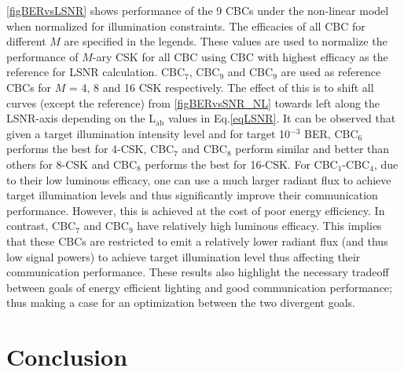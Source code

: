 \documentclass[10pt,letterpaper]{article}
\begin{document}
\figurename{ }\ref{figBERvsLSNR} shows performance of the 9 CBCs under the non-linear model when normalized for illumination constraints. The efficacies of all CBC for different $M$ are specified in the legends. These values are used to normalize the performance of $M$-ary CSK for all CBC using CBC with highest efficacy as the reference for LSNR calculation. CBC$_{7}$, CBC$_{9}$ and CBC$_{9}$ are used as reference CBCs for $M$ = 4, 8 and 16 CSK respectively. The effect of this is to shift all curves (except the reference) from \figurename{ }\ref{figBERvsSNR_NL} towards left along the LSNR-axis depending on the L$_{\text{ab}}$ values in Eq.\eqref{eqLSNR}. It can be observed that given a target illumination intensity level and for target 10$^{-3}$ BER, CBC$_{6}$ performs the best for 4-CSK, CBC$_{7}$ and CBC$_{8}$ perform similar and better than others for 8-CSK and CBC$_{8}$ performs the best for 16-CSK. For CBC$_{1}$-CBC$_{4}$, due to their low luminous efficacy, one can use a much larger radiant flux to achieve target illumination levels and thus significantly improve their communication performance. However, this is achieved at the cost of poor energy efficiency. In contrast, CBC$_{7}$ and CBC$_{9}$ have relatively high luminous efficacy. This implies that these CBCs are restricted to emit a relatively lower radiant flux (and thus low signal powers) to achieve target illumination level thus affecting their communication performance. These results also highlight the necessary tradeoff between goals of energy efficient lighting and good communication performance; thus making a case for an optimization between the two divergent goals.

\section{Conclusion}\label{sCONC}
\end{document}
